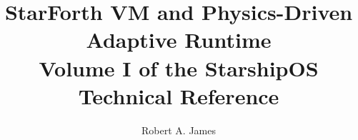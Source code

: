 


\title{StarForth VM and Physics-Driven Adaptive Runtime\\[0.5em]
       \large Volume I of the StarshipOS Technical Reference}
\author{Robert A. James}
\date{%
}


\maketitle
\tableofcontents













